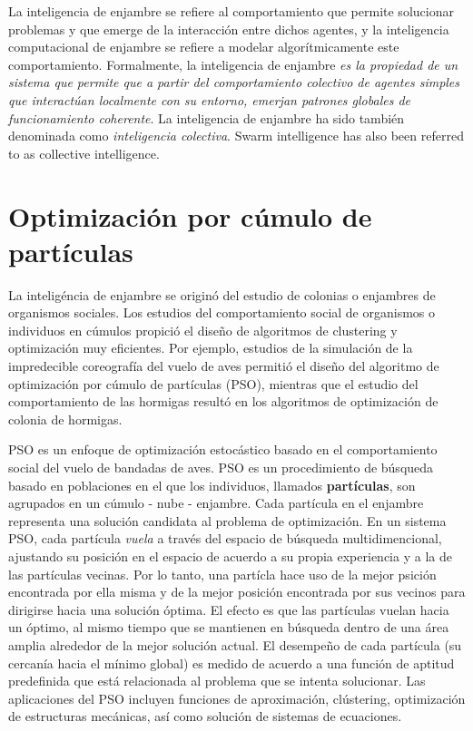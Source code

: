 \documentclass{article}
\begin{document}
La inteligencia de enjambre se refiere al comportamiento que permite solucionar problemas y que emerge de la interacción entre dichos agentes, y la inteligencia computacional de enjambre se refiere a modelar algorítmicamente este comportamiento.
Formalmente, la inteligencia de enjambre \emph{es la propiedad de un sistema que permite que a partir del comportamiento colectivo de agentes simples que interactúan localmente con su entorno, emerjan patrones globales de funcionamiento coherente}.
La inteligencia de enjambre ha sido también denominada como \emph{inteligencia colectiva}.
Swarm intelligence has also been referred to as collective intelligence.



\section{Optimización por cúmulo de partículas}

La inteligéncia de enjambre se originó del estudio de colonias o enjambres de organismos sociales.
Los estudios del comportamiento social de organismos o individuos en cúmulos propició el diseño de algoritmos de clustering y optimización muy eficientes.
Por ejemplo, estudios de la simulación de la impredecible coreografía del vuelo de aves permitió el diseño del algoritmo de optimización por cúmulo de partículas (PSO), mientras que el estudio del comportamiento de las hormigas resultó en los algoritmos de optimización de colonia de hormigas.


PSO es un enfoque de optimización estocástico basado en el comportamiento social del vuelo de bandadas de aves.
PSO es un procedimiento de búsqueda basado en poblaciones en el que los individuos, llamados \textbf{partículas}, son agrupados en un cúmulo - nube - enjambre.
Cada partícula en el enjambre representa una solución candidata al problema de optimización.
En un sistema PSO, cada partícula \emph{vuela} a través del espacio de búsqueda multidimencional, ajustando su posición en el espacio de acuerdo a su propia experiencia y a la de las partículas vecinas.
Por lo tanto, una partícla hace uso de la mejor psición encontrada por ella misma y de la mejor posición encontrada por sus vecinos para dirigirse hacia una solución óptima.
El efecto es que las partículas vuelan hacia un óptimo, al mismo tiempo que se mantienen en búsqueda dentro de una área amplia alrededor de la mejor solución actual.
El desempeño de cada partícula (su cercanía hacia el mínimo global) es medido de acuerdo a una función de aptitud predefinida que está relacionada al problema que se intenta solucionar.
Las aplicaciones del PSO incluyen funciones de aproximación, clústering, optimización de estructuras mecánicas, así como solución de sistemas de ecuaciones.
\end{document}
